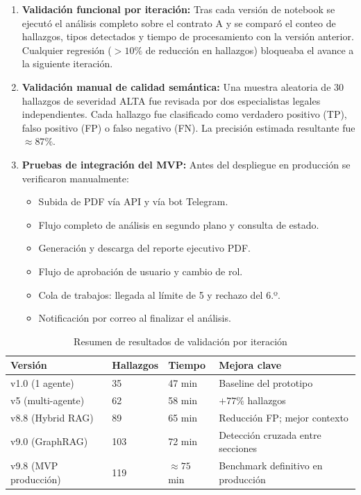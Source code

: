 \begin{enumerate}
    \item \textbf{Validación funcional por iteración:}
    Tras cada versión de notebook se ejecutó el análisis completo sobre
    el contrato A y se comparó el conteo de hallazgos,
    tipos detectados y tiempo de procesamiento con la versión anterior.
    Cualquier regresión ($> 10\%$ de reducción en hallazgos) bloqueaba
    el avance a la siguiente iteración.

    \item \textbf{Validación manual de calidad semántica:}
    Una muestra aleatoria de 30 hallazgos de severidad ALTA fue revisada
    por dos especialistas legales independientes. Cada hallazgo fue
    clasificado como verdadero positivo (TP), falso positivo (FP) o
    falso negativo (FN). La precisión estimada resultante fue $\approx 87\%$.

    \item \textbf{Pruebas de integración del MVP:}
    Antes del despliegue en producción se verificaron manualmente:
    \begin{itemize}
        \item Subida de PDF vía API y vía bot Telegram.
        \item Flujo completo de análisis en segundo plano y consulta de estado.
        \item Generación y descarga del reporte ejecutivo PDF.
        \item Flujo de aprobación de usuario y cambio de rol.
        \item Cola de trabajos: llegada al límite de 5 y rechazo del 6.º.
        \item Notificación por correo al finalizar el análisis.
    \end{itemize}
\end{enumerate}

\begin{table}[H]
\centering
\caption{Resumen de resultados de validación por iteración}
\label{tab:validacion_iter}
\begin{tabular}{p{3cm} p{2.8cm} p{2.2cm} p{4.5cm}}
\toprule
\textbf{Versión} & \textbf{Hallazgos} & \textbf{Tiempo} & \textbf{Mejora clave} \\
\midrule
v1.0 (1 agente)      & 35  & 47 min  & Baseline del prototipo \\
v5   (multi-agente)  & 62  & 58 min  & $+77\%$ hallazgos \\
v8.8 (Hybrid RAG)    & 89  & 65 min  & Reducción FP; mejor contexto \\
v9.0 (GraphRAG)      & 103 & 72 min  & Detección cruzada entre secciones \\
v9.8 (MVP producción) & 119 & $\approx 75$ min & Benchmark definitivo en producción \\
\bottomrule
\end{tabular}
\end{table}

